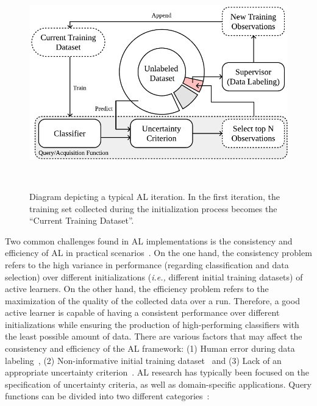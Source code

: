 \documentclass[preprint, 12pt]{elsarticle}
\begin{document}
\begin{figure}[H]
	\centering
	\includegraphics[width=.75\linewidth]{../analysis/al_iteration}
    \caption{%
        Diagram depicting a typical AL iteration. In the first iteration, the
        training set collected during the initialization process becomes the
        ``Current Training Dataset''.
    }~\label{fig:al_iteration}
\end{figure}

Two common challenges found in AL implementations is the consistency and
efficiency of AL in practical scenarios~\cite{Kottke2017}. On the one hand,
the consistency problem refers to the high variance in performance (regarding
classification and data selection) over different initializations
(\textit{i.e.,} different initial training datasets) of active learners. On
the other hand, the efficiency problem refers to the maximization of the
quality of the collected data over a run. Therefore, a good active learner is
capable of having a consistent performance over different initializations
while ensuring the production of high-performing classifiers with the least
possible amount of data. There are various factors that may affect the
consistency and efficiency of the AL framework: (1) Human error during data
labeling~\cite{Li2020}, (2) Non-informative initial training
dataset~\cite{Nguyen2004} and (3) Lack of an appropriate uncertainty
criterion~\cite{Rosario2020}. AL research has typically been focused on the
specification of uncertainty criteria, as well as domain-specific
applications. Query functions can be divided into two different
categories~\cite{Gu2021, Kumar2020}: 
\end{document}
